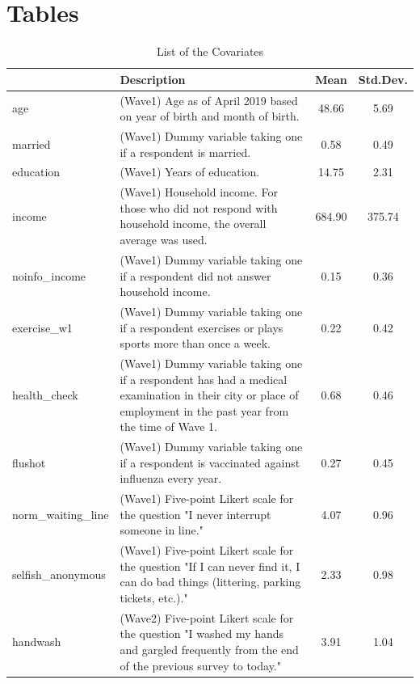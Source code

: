 \documentclass[
    a4paper
]{article}
\begin{document}
\clearpage

\hypertarget{fig-tab}{%
\section{Tables}\label{fig-tab}}

\begin{table}[!h]

\caption{\label{tab:covariate-list}List of the Covariates}
\centering
\fontsize{9}{11}\selectfont
\begin{tabular}[t]{l>{\raggedright\arraybackslash}p{30em}cc}
\toprule
  & Description & Mean & Std.Dev.\\
\midrule
age & (Wave1) Age as of April 2019 based on year of birth and month of birth. & \num{48.66} & \num{5.69}\\
married & (Wave1) Dummy variable taking one if a respondent is married. & \num{0.58} & \num{0.49}\\
education & (Wave1) Years of education. & \num{14.75} & \num{2.31}\\
income & (Wave1) Household income. For those who did not respond with household income, the overall average was used. & \num{684.90} & \num{375.74}\\
noinfo\_income & (Wave1) Dummy variable taking one if a respondent did not answer household income. & \num{0.15} & \num{0.36}\\
exercise\_w1 & (Wave1) Dummy variable taking one if a respondent exercises or plays sports more than once a week. & \num{0.22} & \num{0.42}\\
health\_check & (Wave1) Dummy variable taking one if a respondent has had a medical examination in their city or place of employment in the past year from the time of Wave 1. & \num{0.68} & \num{0.46}\\
flushot & (Wave1) Dummy variable taking one if a respondent is vaccinated against influenza every year. & \num{0.27} & \num{0.45}\\
norm\_waiting\_line & (Wave1) Five-point Likert scale for the question "I never interrupt someone in line." & \num{4.07} & \num{0.96}\\
selfish\_anonymous & (Wave1) Five-point Likert scale for the question "If I can never find it, I can do bad things (littering, parking tickets, etc.)." & \num{2.33} & \num{0.98}\\
handwash & (Wave2) Five-point Likert scale for the question "I washed my hands and gargled frequently from the end of the previous survey to today." & \num{3.91} & \num{1.04}\\

\end{tabular}
\end{table}
\end{document}
